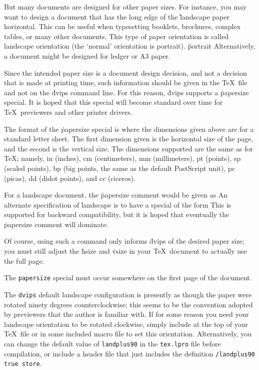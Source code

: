 But many documents are designed for other paper sizes.  For instance,
you may want to design a document that has the long edge of the
\^{landscape}
paper horizontal.  This can be useful when typesetting booklets,
brochures, complex tables, or many other documents.  This type of
paper orientation is called landscape orientation (the `normal'
orientation is portrait).
\^{portrait}
Alternatively, a document might be designed for ledger or A3 paper.

Since the intended paper size is a document design decision, and
not a decision that is made at printing time, such information
should be given in the \TeX\ file and not on the \.{dvips}
command line.  For this reason, \.{dvips} supports a \.{papersize}
special.  It is hoped that this special will become standard over
time for \TeX\ previewers and other printer drivers.

The format of the \.{papersize} special is
\noindent
where the dimensions given above are for a standard letter sheet.
The first dimension given is the horizontal size of the page, and
the second is the vertical size.  The dimensions supported are
the same as for \TeX; namely, in (inches), cm (centimeters), mm
(millimeters), pt (points), sp (scaled points), bp (big points, the
same as the default PostScript unit), pc (picas), dd (didot points),
and cc (ciceros).

For a landscape document, the \.{papersize} comment would be given as
\noindent
An alternate specification of \.{landscape} is to have a special
of the form
\noindent
This is supported for backward compatibility, but it is hoped that
eventually the \.{papersize} comment will dominate.

Of course, using such a command only informs \.{dvips} of the desired
paper size; you must still adjust the \.{hsize} and \.{vsize} in your
\TeX\ document to actually use the full page.

The {\tt papersize} special must occur somewhere on the first page of the
document.

The {\tt dvips} default landscape configuration is presently as though
the paper were rotated ninety degrees counterclockwise; this seems
to be the convention adopted by previewers that the author is
familiar with.  If for some reason you need your landscape orientation
to be rotated clockwise, simply include at the top of your \TeX\ file
or in some included macro file
\noindent
to set this orientation.  Alternatively, you can change the default
value of {\tt landplus90} in the {\tt tex.lpro} file before
compilation, or include a header file that just includes the
definition {\tt /landplus90 true store}.

